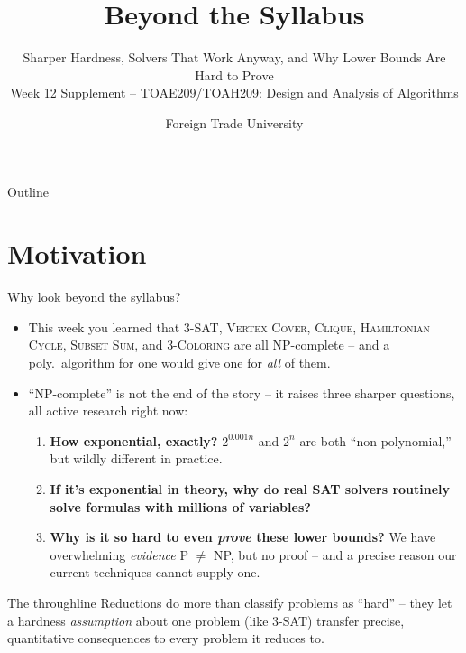 \documentclass[11pt,aspectratio=169]{beamer}
\title{Beyond the Syllabus}
\subtitle{Sharper Hardness, Solvers That Work Anyway, and Why Lower Bounds Are
Hard to Prove\\
\small Week 12 Supplement -- TOAE209/TOAH209: Design and Analysis of Algorithms}
\author{Foreign Trade University}
\date{}
\begin{document}
\begin{frame}
  \titlepage
\end{frame}

\begin{frame}{Outline}
  \tableofcontents
\end{frame}

\section{Motivation}

\begin{frame}{Why look beyond the syllabus?}
  \small
  \begin{itemize}
    \item This week you learned that \textsc{3-SAT}, \textsc{Vertex Cover},
    \textsc{Clique}, \textsc{Hamiltonian Cycle}, \textsc{Subset Sum}, and
    \textsc{3-Coloring} are all NP-complete -- and a poly.\ algorithm for one would give
    one for \emph{all} of them.
    \item ``NP-complete'' is not the end of the story -- it raises three sharper
    questions, all active research right now:
    \begin{enumerate}
      \item \textbf{How exponential, exactly?} $2^{0.001n}$ and $2^{n}$ are both
      ``non-polynomial,'' but wildly different in practice.
      \item \textbf{If it's exponential in theory, why do real SAT solvers routinely
      solve formulas with millions of variables?}
      \item \textbf{Why is it so hard to even \emph{prove} these lower bounds?} We have
      overwhelming \emph{evidence} P $\neq$ NP, but no proof -- and a precise reason our
      current techniques cannot supply one.
    \end{enumerate}
  \end{itemize}
  \begin{alertblock}{The throughline}
    Reductions do more than classify problems as ``hard'' -- they let a hardness
    \emph{assumption} about one problem (like 3-SAT) transfer precise, quantitative
    consequences to every problem it reduces to.
  \end{alertblock}
\end{frame}
\end{document}
